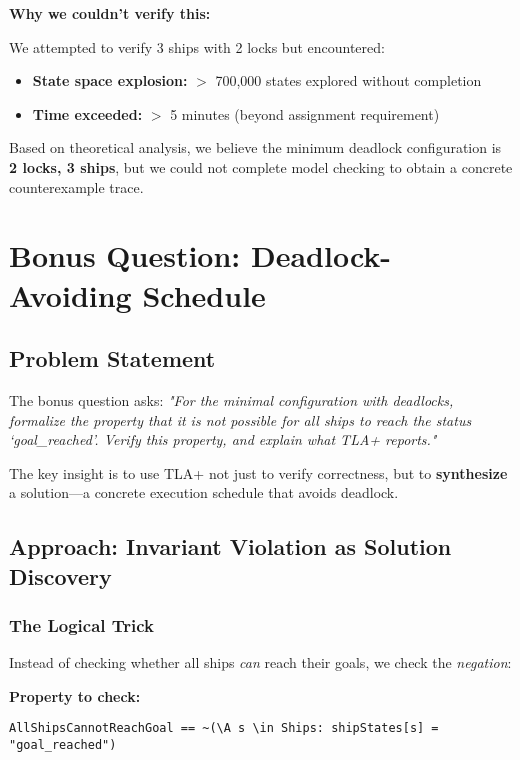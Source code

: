 \documentclass[12pt,a4paper]{article}
\begin{document}
\textbf{Why we couldn't verify this:}

We attempted to verify 3 ships with 2 locks but encountered:
\begin{itemize}
    \item \textbf{State space explosion:} $>$ 700,000 states explored without completion
    \item \textbf{Time exceeded:} $>$ 5 minutes (beyond assignment requirement)
\end{itemize}

Based on theoretical analysis, we believe the minimum deadlock configuration is \textbf{2 locks, 3 ships}, but we could not complete model checking to obtain a concrete counterexample trace.

\newpage
\section{Bonus Question: Deadlock-Avoiding Schedule}

\subsection{Problem Statement}

The bonus question asks: \textit{"For the minimal configuration with deadlocks, formalize the property that it is not possible for all ships to reach the status `goal\_reached'. Verify this property, and explain what TLA+ reports."}

The key insight is to use TLA+ not just to verify correctness, but to \textbf{synthesize} a solution---a concrete execution schedule that avoids deadlock.

\subsection{Approach: Invariant Violation as Solution Discovery}

\subsubsection{The Logical Trick}

Instead of checking whether all ships \textit{can} reach their goals, we check the \textit{negation}:

\textbf{Property to check:}
\begin{lstlisting}[style=tlaplus]
AllShipsCannotReachGoal == ~(\A s \in Ships: shipStates[s] = "goal_reached")
\end{lstlisting}
\end{document}
